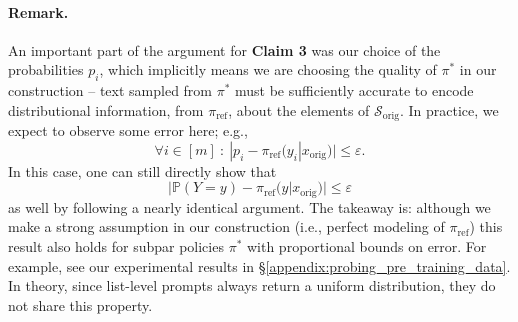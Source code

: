 \paragraph{Remark.} An important part of the argument for \textbf{Claim 3} was our choice of the probabilities $p_i$, which implicitly means we are choosing the quality of $\pi^*$ in our construction -- text sampled from $\pi^*$ must be sufficiently accurate to encode distributional information, from $\pi_\text{ref}$, about the elements of $\mathcal{S}_\text{orig}$. In practice, we expect to observe some error here; e.g.,
\begin{equation}
    \forall i \in [m] \ : \ |p_i -  \pi_\text{ref}(y_i | x_\text{orig})| \leq \varepsilon.
\end{equation}
In this case, one can still directly show that 
\begin{equation}
    |\mathbb{P}(Y = y) - \pi_\text{ref}(y | x_\text{orig})| \leq \varepsilon
\end{equation}
as well by following a nearly identical argument. The takeaway is: although we make a strong assumption in our construction (i.e., perfect modeling of $\pi_\text{ref}$) this result also holds for subpar policies $\pi^*$ with proportional bounds on error. For example, see our experimental results in \S\ref{appendix:probing_pre_training_data}. In theory, since list-level prompts always return a uniform distribution, they do not share this property.

